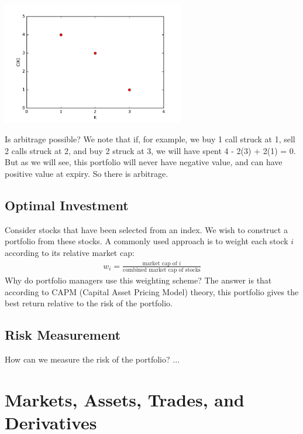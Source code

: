 \documentclass{report}
\numberwithin{problem}{chapter} %
\begin{document}
\includegraphics[width=8cm]{call-arb.pdf}

Is arbitrage possible? We note that if, for example, we buy 1 call struck at 1, sell 2 calls struck at 2, and buy 2 struck at 3, we will have spent 4 - 2(3) + 2(1) = 0. But as we will see, this portfolio will never have negative value, and can have positive value at expiry. So there is arbitrage.

\subsection{Optimal Investment}
Consider stocks that have been selected from an index. We wish to construct a portfolio from these stocks. A commonly used approach is to weight each stock $i$ according to its relative market cap:
\begin{eqnarray*}
w_i = \frac{\mbox{market cap of }i}{\mbox{combined market cap of stocks}}
\end{eqnarray*}
Why do portfolio managers use this weighting scheme? The answer is that according to CAPM (Capital Asset Pricing Model) theory, this portfolio gives the best return relative to the risk of the portfolio.

\subsection{Risk Measurement}
How can we measure the risk of the portfolio? ...

\pagebreak
\section{Markets, Assets, Trades, and Derivatives}

\end{document}
